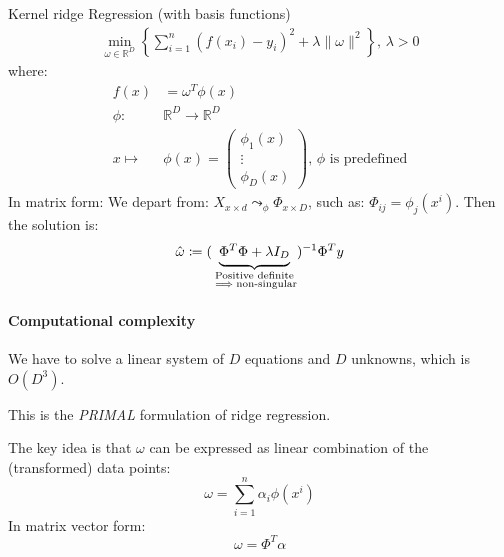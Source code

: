 \pagebreak
\begin{example}[breakable]{Kernel ridge Regression (with basis functions)}{}
	\begin{align*}
		\min_{\omega \in \mathds R^D} \left\{
		\sum_{i=1}^n (f(x_i) - y_i)^2 + \lambda \lVert \omega \rVert^2
		\right\},\, \lambda > 0
	\end{align*}
	where:
	\begin{align*}
		f(x)      & = \omega^T \phi(x)                                    \\
		\phi :    & \mathds R^D \to \mathds R^D                           \\
		x \mapsto & \phi(x) = \begin{pmatrix}
			                      \phi_1(x) \\
			                      \vdots    \\
			                      \phi_D(x)
		                      \end{pmatrix},\, \phi \text{ is predefined}
	\end{align*}
	\tcbline
	In matrix form: We depart from:
	$X_{x\times d} \leadsto_{\phi} \Phi_{x\times D}$,
	such as: $\Phi_{ij} = \phi_j(x^i)$. Then
	the solution is:
	\begin{equation*}
		\hat \omega \coloneqq
		(\underbrace{\vphantom{\bigr|}\Phi^T \Phi + \lambda I_D}_{\substack{\text{Positive definite}
				\\ \implies \text{non-singular}}})^{-1} \Phi^T y
	\end{equation*}

	\paragraph{Computational complexity}
	We have to solve a linear system of $D$ equations and $D$ unknowns,
	which is $O(D^3)$.

	\begin{note}
		This is the \emph{PRIMAL} formulation of ridge regression.
	\end{note}


	\begin{note}
		The key idea is that $\omega$ can be expressed as linear combination of
		the (transformed) data points:
		\begin{equation*}
			\omega = \sum_{i=1}^n \alpha_i \phi(x^i)
		\end{equation*}
		In matrix vector form:
		\begin{equation*}
			\omega = \Phi^T \alpha
		\end{equation*}
	\end{note}


\end{example}

